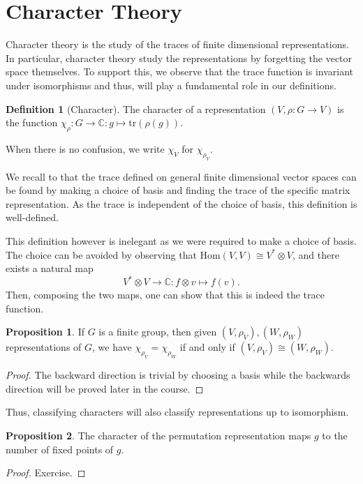 \documentclass[]{article}
\theoremstyle{definition}
\theoremstyle{definition}
\newtheorem{definition}{Definition}[section]
\newtheorem{proposition}{Proposition}[section]
\begin{document}
\newpage 
\section{Character Theory}

Character theory is the study of the traces of finite dimensional representations.
In particular, character theory study the representations by forgetting the 
vector space themselves. To support this, we observe that the trace function 
is invariant under isomorphisms and thus, will play a fundamental role 
in our definitions. 

\begin{definition}[Character]
  The character of a representation \((V, \rho : G \to V)\) is 
  the function \(\chi_\rho : G \to \mathbb{C} : g \mapsto \text{tr}(\rho(g))\). 

  When there is no confusion, we write \(\chi_V\) for \(\chi_{\rho_V}\).
\end{definition}

We recall to that the trace defined on general finite dimensional vector spaces 
can be found by making a choice of basis and finding the trace of the specific 
matrix representation. As the trace is independent of the choice of basis, 
this definition is well-defined. 

This definition however is inelegant as we were required to make a choice of basis. 
The choice can be avoided by observing that \(\text{Hom}(V, V) \cong V^* \otimes V\), 
and there exists a natural map 
\[V^* \otimes V \to \mathbb{C} : f \otimes v \mapsto f(v).\]
Then, composing the two maps, one can show that this is indeed the trace function.

\begin{proposition}
  If \(G\) is a finite group, then given \((V, \rho_V), (W, \rho_W)\) representations 
  of \(G\), we have \(\chi_{\rho_V} = \chi_{\rho_W}\) if and only if 
  \((V, \rho_V) \cong (W, \rho_W)\).
\end{proposition}
\begin{proof}
  The backward direction is trivial by choosing a basis while the backwards direction 
  will be proved later in the course.
\end{proof}

Thus, classifying characters will also classify representations up to isomorphism.

\begin{proposition}
  The character of the permutation representation maps \(g\) to the number of 
  fixed points of \(g\).
\end{proposition}
\begin{proof}
  Exercise.
\end{proof}
\end{document}
